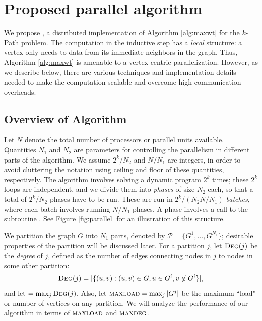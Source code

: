 \section{Proposed parallel algorithm}
\label{sec:proposed}
We propose \parmaxwt{}, a distributed implementation of Algorithm \ref{alg:maxwt} for the $k$-Path problem. The computation in the inductive step has a \emph{local} structure: a vertex only needs to data from its immediate neighbors in the graph. Thus, Algorithm \ref{alg:maxwt} is amenable to a vertex-centric parallelization. However, as we describe below, there are various techniques and implementation details needed to make the computation scalable and overcome high communication overheads.  


\subsection{Overview of Algorithm \parmaxwt{}}
Let $N$ denote the total number of
processors or parallel units available. Quantities $N_1$ and $N_2$ are parameters for controlling the parallelism
in different parts of the algorithm.  
We assume $2^k/N_2$ and $N/N_1$ are integers, in order to avoid cluttering the
notation using ceiling and floor of these quantities, respectively.
The algorithm involves solving a dynamic program $2^k$ times; these $2^k$ loops are independent, and we divide them into \emph{phases} of size $N_2$ each, so that a total of $2^k/N_2$ phases have to be run. These are run in $2^k/(N_2N/N_1)$ \emph{batches}, where each batch involves running $N/N_1$ phases. A phase involves a call to the subroutine \parcircuitpath{}.
See Figure \ref{fig:parallel} for an illustration of this structure.

We partition the graph $G$ into $N_1$ parts, denoted by
$\mathcal{P}=\{G^1, \ldots, G^{N_1}\}$; desirable properties of the partition will be discussed later. For a partition $j$, let $\textsc{Deg}(j)$ be the \emph{degree} of $j$, defined as the number of edges connecting nodes in $j$ to nodes in some other partition:
$$
\textsc{Deg}(j) = |\{(u, v): (u, v) \in G, u \in G^i, v \not \in G^i\}|,
$$
and let \maxdeg{} $ = \max_{j} \textsc{Deg}(j)$. Also, let $\textsc{maxload}{} = \max_j |G^j|$ be the maximum ``load" or number of vertices on any partition. We will analyze the performance of our algorithm in terms of $\textsc{maxload}{}$ and $\textsc{maxdeg}{}$.

